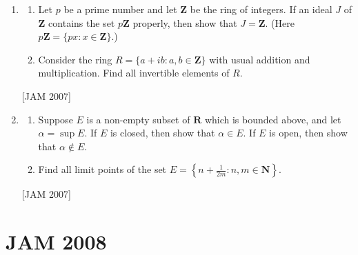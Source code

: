 \begin{enumerate}
  
\item 
\begin{enumerate}
    \item Let $p$ be a prime number and let $\mathbf{Z}$ be the ring of integers. If an ideal $J$ of $\mathbf{Z}$ contains the set $p \mathbf{Z}$ properly, then show that $J=\mathbf{Z}$. (Here $p \mathbf{Z}=\{p x: x \in \mathbf{Z}\}$.)


    \item  Consider the ring $R=\{a+i b: a, b \in \mathbf{Z}\}$ with usual addition and multiplication. Find all invertible elements of $R$.
\end{enumerate}
\hfill [JAM 2007] 


\item 
\begin{enumerate}
    \item  Suppose $E$ is a non-empty subset of $\mathbf{R}$ which is bounded above, and let $\alpha=\sup E$. If $E$ is closed, then show that $\alpha \in E$. If $E$ is open, then show that $\alpha \notin E$.

    \item  Find all limit points of the set $E=\left\{n+\frac{1}{2 m}: n, m \in \mathbf{N}\right\}$.
\end{enumerate}
\hfill [JAM 2007] 


\end{enumerate}




\newpage
\section{JAM 2008}

